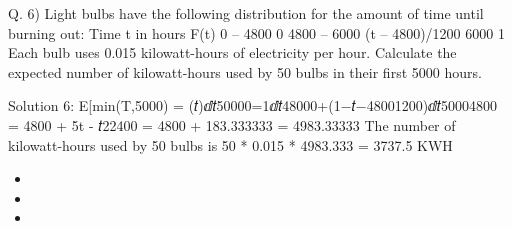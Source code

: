 Q. 6)
Light bulbs have the following distribution for the amount of time until burning out:
Time t in hours
F(t)
0 – 4800
0
4800 – 6000
(t – 4800)/1200
6000
1
Each bulb uses 0.015 kilowatt-hours of electricity per hour.
Calculate the expected number of kilowatt-hours used by 50 bulbs in their first 5000 hours.


Solution 6:
E[min(T,5000) = (𝑡)ⅆ𝑡50000=\int1ⅆ𝑡48000+\int(1−𝑡−48001200)ⅆ𝑡50004800 
= 4800 + 5t - 𝑡22400
= 4800 + 183.333333
= 4983.33333 
The number of kilowatt-hours used by 50 bulbs is 50 * 0.015 * 4983.333 = 3737.5 KWH



\begin{itemize}
\item 
\item 
\item 
\end{itemize}
